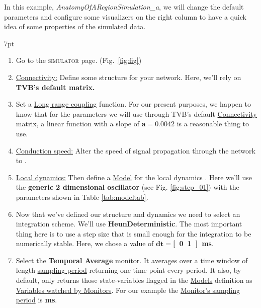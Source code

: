 \documentclass{tufte-handout}
\newenvironment{simulation}{%
  \def\FrameCommand{%
    \hspace{1pt}%
    {\color{ForestGreen}\vrule width 2pt}%
    {\color{simulationshade}\vrule width 4pt}%
    \colorbox{simulationshade}%
  }%
  \MakeFramed{\advance\hsize-\width\FrameRestore}%
  \noindent\hspace{-4.55pt}%
  \begin{adjustwidth}{}{7pt}%
  \vspace{2pt}\vspace{2pt}%
}
{%
  \vspace{2pt}\end{adjustwidth}\endMakeFramed%
}
\begin{document}
In this example, \textit{AnatomyOfARegionSimulation\_a}, we will change the
default parameters and configure some visualizers on the right column to have
a quick idea of some properties of the simulated data.

\begin{simulation}
\begin{enumerate}
\item Go to the \textsc{simulator} page. (Fig.~\ref{fig:fig})

\item \underline{Connectivity:} Define some structure for your network. Here, we'll rely on \textbf{TVB's default  matrix.} 

\item Set a \underline{Long range coupling} function. For our present purposes, we happen to know that for the parameters we will use through TVB's default \underline{Connectivity} matrix, a linear function with a slope of $\mathbf{a=0.0042}$ is a reasonable thing to use. 

\item \underline{Conduction speed:} Alter the speed of signal propagation through the network to \textbf{}. 

\item \underline{Local dynamics:} Then define a \underline{Model} for the local dynamics . Here we'll use the \textbf{generic 2 dimensional oscillator} (see Fig. \ref{fig:step_01}) with the parameters shown in Table \ref{tab:modeltab}.


\item Now that we've defined our structure and dynamics we need to select an integration scheme. We'll use \textbf{HeunDeterministic}. The most important thing here is to use a step size that is small enough for the integration to be numerically stable. Here, we chose a value of $\mathbf{dt=}$\textbf{\unit[0.1]{ms}}.

\item  Select the \textbf{Temporal Average} monitor. It averages over a time window of length \underline{sampling period} returning one time point every period. It also, by default, only returns those state-variables flagged in the \underline{Models} definition as \underline{Variables watched by Monitors}. For our example the \underline{Monitor's sampling period} is \textbf{\unit[1]{ms}}. 
\end{enumerate}
\end{simulation}
\end{document}
